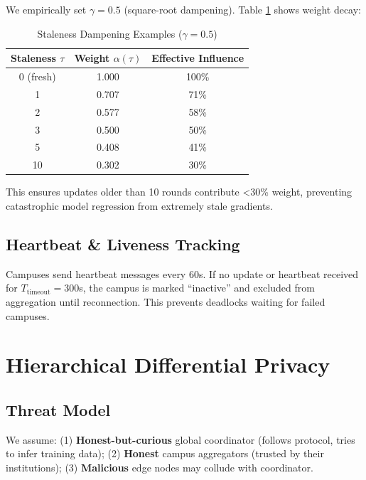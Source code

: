 \documentclass[conference]{IEEEtran}
\begin{document}
We empirically set $\gamma = 0.5$ (square-root dampening). Table \ref{tab:staleness_weights} shows weight decay:

\begin{table}[h]
\centering
\caption{Staleness Dampening Examples ($\gamma=0.5$)}
\label{tab:staleness_weights}
\begin{tabular}{ccc}
\toprule
\textbf{Staleness $\tau$} & \textbf{Weight $\alpha(\tau)$} & \textbf{Effective Influence} \\
\midrule
0 (fresh) & 1.000 & 100\% \\
1 & 0.707 & 71\% \\
2 & 0.577 & 58\% \\
3 & 0.500 & 50\% \\
5 & 0.408 & 41\% \\
10 & 0.302 & 30\% \\
\bottomrule
\end{tabular}
\end{table}

This ensures updates older than 10 rounds contribute <30\% weight, preventing catastrophic model regression from extremely stale gradients.

\subsection{Heartbeat \& Liveness Tracking}

Campuses send heartbeat messages every 60s. If no update or heartbeat received for $T_{\text{timeout}} = 300$s, the campus is marked ``inactive'' and excluded from aggregation until reconnection. This prevents deadlocks waiting for failed campuses.

\section{Hierarchical Differential Privacy}

\subsection{Threat Model}

We assume: (1) \textbf{Honest-but-curious} global coordinator (follows protocol, tries to infer training data); (2) \textbf{Honest} campus aggregators (trusted by their institutions); (3) \textbf{Malicious} edge nodes may collude with coordinator.
\end{document}
